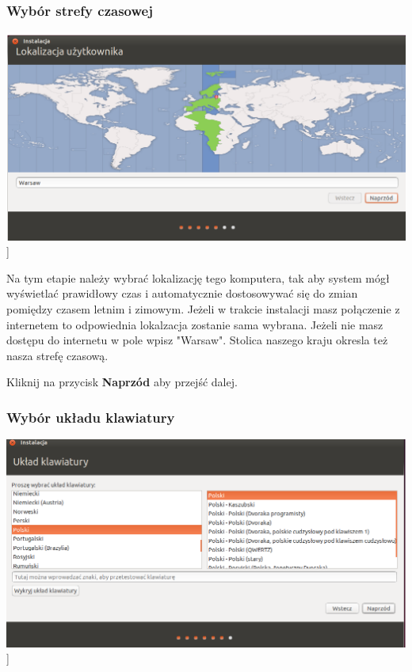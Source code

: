 \subsubsection{Wybór strefy czasowej}
\label{subsub:instalator_strefa_czasowa}
\begin{center}
	\includegraphics[scale=0.5]{images/instalator_czas.png}]
\end{center}
Na tym etapie należy wybrać lokalizację tego komputera, tak aby system mógł wyświetlać prawidłowy czas i automatycznie dostosowywać się do zmian pomiędzy czasem letnim i zimowym. Jeżeli w trakcie instalacji masz połączenie z internetem to odpowiednia lokalzacja zostanie sama wybrana. Jeżeli nie masz dostępu do internetu w pole wpisz "Warsaw". Stolica naszego kraju okresla też nasza strefę czasową.

\begin{flushright}
Kliknij na przycisk \textbf{Naprzód} aby przejść dalej.
\end{flushright}
\clearpage

\subsubsection{Wybór układu klawiatury}
\begin{center}
	\includegraphics[scale=0.5]{images/instalator_klawiatura.png}]
\end{center}

